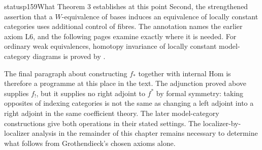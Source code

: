 \begin{dcomment}{status}{p159}{What Theorem 3 establishes at this point}
Second, the strengthened assertion that a $W$-equivalence of bases induces an equivalence of locally constant categories uses additional control of fibres. The annotation names the earlier axiom L6, and the following pages examine exactly where it is needed. For ordinary weak equivalences, homotopy invariance of locally constant model-category diagrams is proved by \citet[Theorem~1.3]{Cisinski2009LocallyConstant}.

The final paragraph about constructing $f_*$ together with internal Hom is therefore a programme at this place in the text. The adjunction proved above supplies $f_!$, but it supplies no right adjoint to $f^*$ by formal symmetry: taking opposites of indexing categories is not the same as changing a left adjoint into a right adjoint in the same coefficient theory. The later model-category constructions give both operations in their stated settings. The localizer-by-localizer analysis in the remainder of this chapter remains necessary to determine what follows from Grothendieck's chosen axioms alone.
\end{dcomment}

